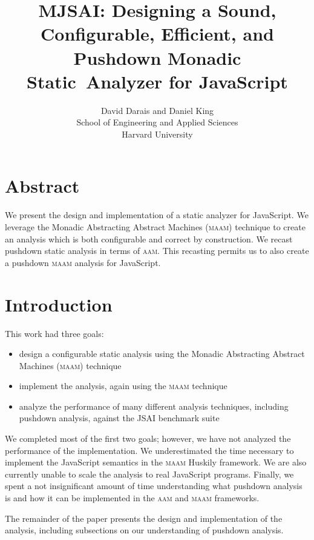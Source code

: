 \documentclass[10pt,letter,english]{article}
\newcommand{\aam}[0]{\textsc{aam}}
\newcommand{\maam}[0]{\textsc{maam}}
\newcommand{\js}[0]{JavaScript}
\begin{document}
\title{MJSAI: Designing a Sound, Configurable, Efficient, and Pushdown %
              Monadic Static~Analyzer for JavaScript}
\author{{David Darais and Daniel King}\\
        School of Engineering and Applied Sciences\\
        Harvard University}

\maketitle

\section*{Abstract}

We present the design and implementation of a static analyzer for \js{}. We
leverage the Monadic Abstracting Abstract Machines (\maam{}) technique to create
an analysis which is both configurable and correct by construction. We recast
pushdown static analysis in terms of \aam{}. This recasting permits us to also
create a pushdown \maam{} analysis for \js{}.

\section{Introduction}

This work had three goals:

\begin{itemize}
\item design a configurable static analysis using the Monadic Abstracting
  Abstract Machines (\maam{}) technique
\item implement the analysis, again using the \maam{} technique
\item analyze the performance of many different analysis techniques, including
  pushdown analysis, against the JSAI \cite{jsai} benchmark suite
\end{itemize}

We completed most of the first two goals; however, we have not analyzed the
performance of the implementation. We underestimated the time necessary to
implement the JavaScript semantics in the \maam{} Huskily framework. We are also
currently unable to scale the analysis to real \js{} programs. Finally, we spent
a not insignificant amount of time understanding what pushdown analysis is and
how it can be implemented in the \aam{} and \maam{} frameworks.

The remainder of the paper presents the design and implementation of the
analysis, including subsections on our understanding of pushdown analysis.
\end{document}
